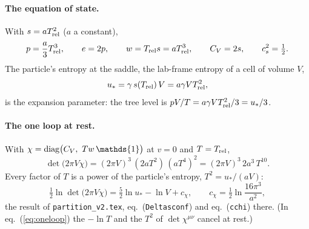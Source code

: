 \documentclass[11pt,aps,preprint,nofootinbib,superscriptaddress,tightenlines]{revtex4-2}
\newcommand{\one}{\mathds{1}}
\def\st{\begin{equation}}
\def\stp{\end{equation}}
\def\Eq#1{eq.~(\ref{#1})}
\let\oldparagraph\paragraph
\renewcommand{\paragraph}{\par\bigskip\oldparagraph}
\begin{document}
\paragraph{The equation of state.}  With $s=aT_{\rm rel}^2$ ($a$ a constant),
\st
p=\frac a3T_{\rm rel}^3,\qquad e=2p,\qquad w=T_{\rm rel}s=aT_{\rm rel}^3,\qquad C_V=2s,\qquad c_s^2=\tfrac12 .
\label{eq:confeos}
\stp
The particle's entropy at the saddle, the lab-frame entropy of a cell of volume $V$,
\st
u_*=\gamma\,s(T_{\rm rel})\,V=a\gamma VT_{\rm rel}^2 ,
\label{eq:ustar}
\stp
is the expansion parameter: the tree level is $pV/T=a\gamma VT_{\rm rel}^2/3=u_*/3$.

\paragraph{The one loop at rest.}  With $\chi={\rm diag}\big(C_V,\ Tw\,\one\big)$ at $v=0$ and $T=T_{\rm rel}$,
\st
\det\big(2\pi V\chi\big)=(2\pi V)^3\,(2aT^2)\,(aT^4)^2=(2\pi V)^3\,2a^3\,T^{10} .
\stp
Every factor of $T$ is a power of the particle's entropy, $T^2=u_*/(aV)$:
\st
\tfrac12\ln\det\big(2\pi V\chi\big)=\tfrac52\ln u_*-\ln V+c_\chi,\qquad c_\chi=\tfrac12\ln\frac{16\pi^3}{a^2} ,
\label{eq:conf_rest}
\stp
the result of \nolinkurl{partition_v2.tex}, eq.~(\texttt{Deltasconf}) and eq.~(\texttt{cchi}) there.  (In \Eq{eq:oneloop} the $-\ln T$ and the $T^2$ of $\det\chi^{\mu\nu}$
cancel at rest.)
\end{document}

